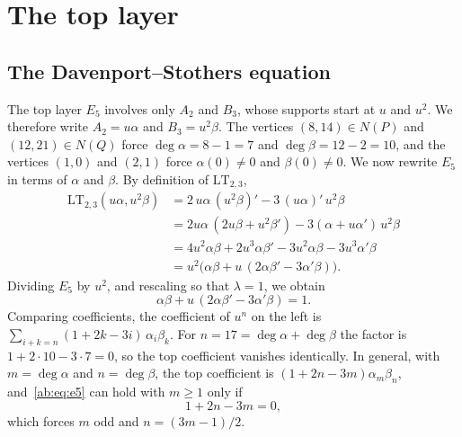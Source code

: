 \documentclass[a4paper,11pt]{article}
\theoremstyle{jsplain}
\theoremstyle{jsdef}
\theoremstyle{jsrem}
\begin{document}
\section{The top layer}\label{ab:sec:top}

\subsection{The Davenport--Stothers equation}

The top layer $E_5$ involves only $A_2$ and $B_3$, whose supports start at $u$ and $u^2$. We therefore write $A_2=u\alpha$ and $B_3=u^2\beta$. The vertices $(8,14)\in N(P)$ and $(12,21)\in N(Q)$ force $\deg\alpha=8-1=7$ and $\deg\beta=12-2=10$, and the vertices $(1,0)$ and $(2,1)$ force $\alpha(0)\ne0$ and $\beta(0)\ne0$. We now rewrite $E_5$ in terms of $\alpha$ and $\beta$. By definition of $\mathrm{LT}_{2,3}$,
\begin{align*}
\mathrm{LT}_{2,3}(u\alpha,u^2\beta)
&=2\,u\alpha\,(u^2\beta)'-3\,(u\alpha)'\,u^2\beta\\
&=2u\alpha\,(2u\beta+u^2\beta')-3(\alpha+u\alpha')\,u^2\beta\\
&=4u^2\alpha\beta+2u^3\alpha\beta'-3u^2\alpha\beta-3u^3\alpha'\beta\\
&=u^2\bigl(\alpha\beta+u\,(2\alpha\beta'-3\alpha'\beta)\bigr).
\end{align*}
Dividing $E_5$ by $u^2$, and rescaling so that $\lambda=1$, we obtain
\begin{equation}\label{ab:eq:e5}
\alpha\beta+u\,(2\alpha\beta'-3\alpha'\beta)=1 .
\end{equation}
Comparing coefficients, the coefficient of $u^n$ on the left is $\sum_{i+k=n}(1+2k-3i)\,\alpha_i\beta_k$. For $n=17=\deg\alpha+\deg\beta$ the factor is $1+2\cdot10-3\cdot7=0$, so the top coefficient vanishes identically. In general, with $m=\deg\alpha$ and $n=\deg\beta$, the top coefficient is $(1+2n-3m)\alpha_m\beta_n$, and~\eqref{ab:eq:e5} can hold with $m\ge1$ only if
\begin{equation}\label{ab:eq:mn}
1+2n-3m=0,
\end{equation}
which forces $m$ odd and $n=(3m-1)/2$.
\end{document}
